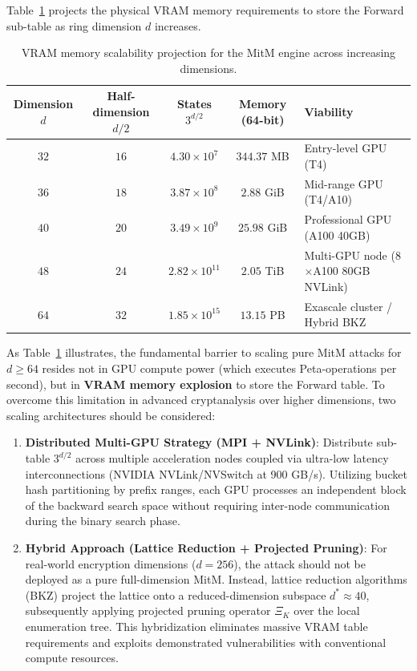 \documentclass[11pt,a4paper]{article}
\theoremstyle{plain}
\theoremstyle{definition}
\numberwithin{equation}{section}
\begin{document}
Table~\ref{tab:escalabilidad_mitm} projects the physical VRAM memory requirements to store the Forward sub-table as ring dimension $d$ increases.

\begin{table}[htbp]
\centering
\caption{VRAM memory scalability projection for the MitM engine across increasing dimensions.}
\label{tab:escalabilidad_mitm}
\small
\begin{tabular}{c c c c p{3.8cm}}
\toprule
\textbf{Dimension $d$} & \textbf{Half-dimension $d/2$} & \textbf{States $3^{d/2}$} & \textbf{Memory (64-bit)} & \textbf{Viability} \\
\midrule
$32$ & $16$ & $4.30 \times 10^7$ & $344.37$ MB & Entry-level GPU (T4) \\
$36$ & $18$ & $3.87 \times 10^8$ & $2.88$ GiB & Mid-range GPU (T4/A10) \\
$40$ & $20$ & $3.49 \times 10^9$ & $25.98$ GiB & Professional GPU (A100 40GB) \\
$48$ & $24$ & $2.82 \times 10^{11}$ & $2.05$ TiB & Multi-GPU node (8$\times$A100 80GB NVLink) \\
$64$ & $32$ & $1.85 \times 10^{15}$ & $13.15$ PB & Exascale cluster / Hybrid BKZ \\
\bottomrule
\end{tabular}
\end{table}

As Table~\ref{tab:escalabilidad_mitm} illustrates, the fundamental barrier to scaling pure MitM attacks for $d \ge 64$ resides not in GPU compute power (which executes Peta-operations per second), but in \textbf{VRAM memory explosion} to store the Forward table. To overcome this limitation in advanced cryptanalysis over higher dimensions, two scaling architectures should be considered:

\begin{enumerate}
    \item \textbf{Distributed Multi-GPU Strategy (MPI + NVLink)}: Distribute sub-table $3^{d/2}$ across multiple acceleration nodes coupled via ultra-low latency interconnections (NVIDIA NVLink/NVSwitch at 900 GB/s). Utilizing bucket hash partitioning by prefix ranges, each GPU processes an independent block of the backward search space without requiring inter-node communication during the binary search phase.
    \item \textbf{Hybrid Approach (Lattice Reduction + Projected Pruning)}: For real-world encryption dimensions ($d=256$), the attack should not be deployed as a pure full-dimension MitM. Instead, lattice reduction algorithms (BKZ) project the lattice onto a reduced-dimension subspace $d^* \approx 40$, subsequently applying projected pruning operator $\Xi_K$ over the local enumeration tree. This hybridization eliminates massive VRAM table requirements and exploits demonstrated vulnerabilities with conventional compute resources.
\end{enumerate}
\end{document}
